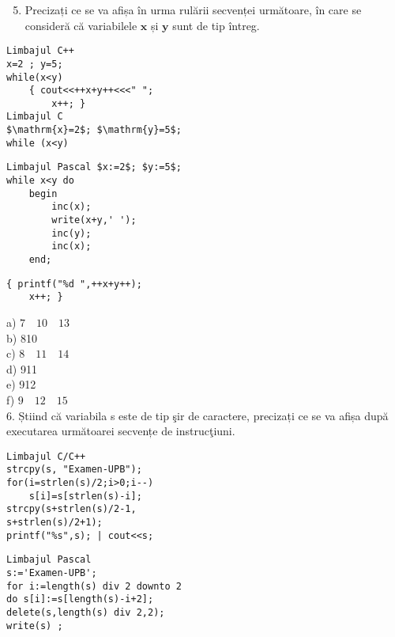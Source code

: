 \begin{enumerate}
  \setcounter{enumi}{4}
  \item Precizați ce se va afișa în urma rulării secvenței următoare, în care se consideră că variabilele $\mathbf{x}$ și $\mathbf{y}$ sunt de tip întreg.
\end{enumerate}

\begin{verbatim}
Limbajul C++
x=2 ; y=5;
while(x<y)
    { cout<<++x+y++<<<" ";
        x++; }
Limbajul C
$\mathrm{x}=2$; $\mathrm{y}=5$;
while (x<y)
\end{verbatim}

\begin{verbatim}
Limbajul Pascal $x:=2$; $y:=5$;
while x<y do
    begin
        inc(x);
        write(x+y,' ');
        inc(y);
        inc(x);
    end;
\end{verbatim}

\begin{verbatim}
{ printf("%d ",++x+y++);
    x++; }
\end{verbatim}

a) $7 \quad 10 \quad 13$\\
b) 810\\
c) $8 \quad 11 \quad 14$\\
d) 911\\
e) 912\\
f) $9 \quad 12 \quad 15$\\
6. Știind că variabila s este de tip şir de caractere, precizați ce se va afișa după executarea următoarei secvențe de instrucţiuni.

\begin{verbatim}
Limbajul C/C++
strcpy(s, "Examen-UPB");
for(i=strlen(s)/2;i>0;i--)
    s[i]=s[strlen(s)-i];
strcpy(s+strlen(s)/2-1,
s+strlen(s)/2+1);
printf("%s",s); | cout<<s;
\end{verbatim}

\begin{verbatim}
Limbajul Pascal
s:='Examen-UPB';
for i:=length(s) div 2 downto 2
do s[i]:=s[length(s)-i+2];
delete(s,length(s) div 2,2);
write(s) ;
\end{verbatim}

